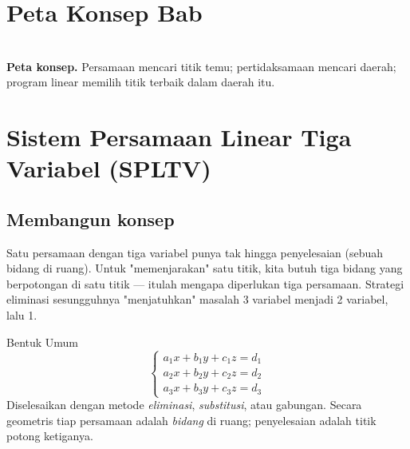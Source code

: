\documentclass[11pt,a4paper]{report}
\theoremstyle{gaya}
\begin{document}
\section*{Peta Konsep Bab}
\begin{center}
\\
\small \textbf{Peta konsep.} Persamaan mencari titik temu; pertidaksamaan mencari daerah; program linear memilih titik terbaik dalam daerah itu.
\end{center}

\section{Sistem Persamaan Linear Tiga Variabel (SPLTV)}

\subsection*{Membangun konsep}
Satu persamaan dengan tiga variabel punya tak hingga penyelesaian (sebuah bidang di ruang). Untuk "memenjarakan" satu titik, kita butuh tiga bidang yang berpotongan di satu titik --- itulah mengapa diperlukan tiga persamaan. Strategi eliminasi sesungguhnya "menjatuhkan" masalah 3 variabel menjadi 2 variabel, lalu 1.

\begin{konsep}{Bentuk Umum}
\[
\begin{cases}
a_1 x + b_1 y + c_1 z = d_1\\
a_2 x + b_2 y + c_2 z = d_2\\
a_3 x + b_3 y + c_3 z = d_3
\end{cases}
\]
Diselesaikan dengan metode \emph{eliminasi}, \emph{substitusi}, atau gabungan. Secara geometris tiap persamaan adalah \emph{bidang} di ruang; penyelesaian adalah titik potong ketiganya.
\end{konsep}
\end{document}
